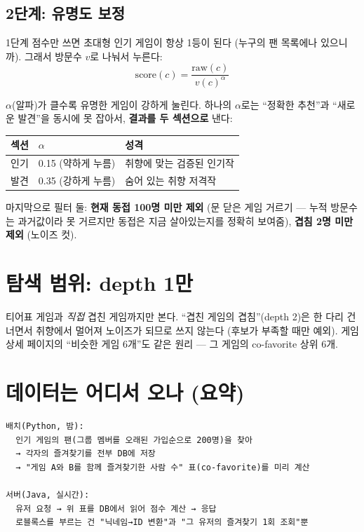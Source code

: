 \documentclass[11pt]{article}
\begin{document}
\subsection{2단계: 유명도 보정}

1단계 점수만 쓰면 초대형 인기 게임이 항상 1등이 된다 (누구의 팬 목록에나 있으니까).
그래서 방문수 $v$로 나눠서 누른다:
\begin{equation}
  \mathrm{score}(c) = \frac{\mathrm{raw}(c)}{v(c)^{\alpha}}
\end{equation}

$\alpha$(알파)가 클수록 유명한 게임이 강하게 눌린다. 하나의 $\alpha$로는
``정확한 추천''과 ``새로운 발견''을 동시에 못 잡아서, \textbf{결과를 두 섹션으로} 낸다:

\begin{center}
\begin{tabular}{lll}
\toprule
섹션 & $\alpha$ & 성격 \\
\midrule
인기 & 0.15 (약하게 누름) & 취향에 맞는 검증된 인기작 \\
발견 & 0.35 (강하게 누름) & 숨어 있는 취향 저격작 \\
\bottomrule
\end{tabular}
\end{center}

마지막으로 필터 둘: \textbf{현재 동접 100명 미만 제외} (문 닫은 게임 거르기 ---
누적 방문수는 과거값이라 못 거르지만 동접은 지금 살아있는지를 정확히 보여줌),
\textbf{겹침 2명 미만 제외} (노이즈 컷).

\section{탐색 범위: depth 1만}

티어표 게임과 \emph{직접} 겹친 게임까지만 본다. ``겹친 게임의 겹침''(depth 2)은
한 다리 건너면서 취향에서 멀어져 노이즈가 되므로 쓰지 않는다 (후보가 부족할 때만 예외).
게임 상세 페이지의 ``비슷한 게임 6개''도 같은 원리 --- 그 게임의 co-favorite 상위 6개.

\section{데이터는 어디서 오나 (요약)}

\begin{Verbatim}[frame=single, fontsize=\small]
배치(Python, 밤):
  인기 게임의 팬(그룹 멤버를 오래된 가입순으로 200명)을 찾아
  → 각자의 즐겨찾기를 전부 DB에 저장
  → "게임 A와 B를 함께 즐겨찾기한 사람 수" 표(co-favorite)를 미리 계산

서버(Java, 실시간):
  유저 요청 → 위 표를 DB에서 읽어 점수 계산 → 응답
  로블록스를 부르는 건 "닉네임→ID 변환"과 "그 유저의 즐겨찾기 1회 조회"뿐
\end{Verbatim}
\end{document}
